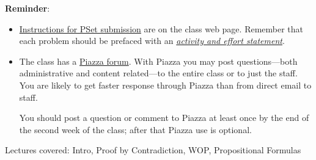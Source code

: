 \documentclass[handout]{mcs}
\begin{document}
\renewcommand{\reading}{
\begin{itemize}
\item Chapter~\bref{proofs_chap}{.\ \emph{What is a Proof?}}

\item  Chapter~\bref{well_ordering_chap}{.\ \emph{The Well Ordering
      Principle}} through~\bref{factor_sec}{;}
  (omit~\bref{well_ordering_sec}{.\ \emph{Well Ordered Sets}})

\item Chapter~\bref{logicform_chap}{.\ \emph{Logical Formulas}}
  through~\bref{equiv_valid_sec}

\end{itemize}
These assigned readings do \textbf{not}
  include the Problem sections.  (Many of the problems in the text
  will appear as class or homework problems.)}


\medskip

\textbf{Reminder}:

\begin{itemize}

\item
  \href{https://courses.csail.mit.edu/6.042/fall17/pset_instructions}
       {Instructions for PSet submission} are on the class web page. Remember that each problem should be prefaced with an
       \href{http://courses.csail.mit.edu/6.042/fall17/pset_instructions.shtml}
            {\emph{activity and effort statement}}.

\item The class has a
  \href{https://piazza.com/mit/fall2017/604218062/home} {Piazza
    forum}.  With Piazza you may post questions---both administrative
  and content related---to the entire class or to just the staff.  You
  are likely to get faster response through Piazza than from direct
  email to staff.

  You should post a question or comment to Piazza at least once by the
  end of the second week of the class; after that Piazza use is
  optional.
\end{itemize}

\begin{staffnotes}
Lectures covered: Intro, Proof by Contradiction, WOP, Propositional Formulas
\end{staffnotes}







\end{document}
